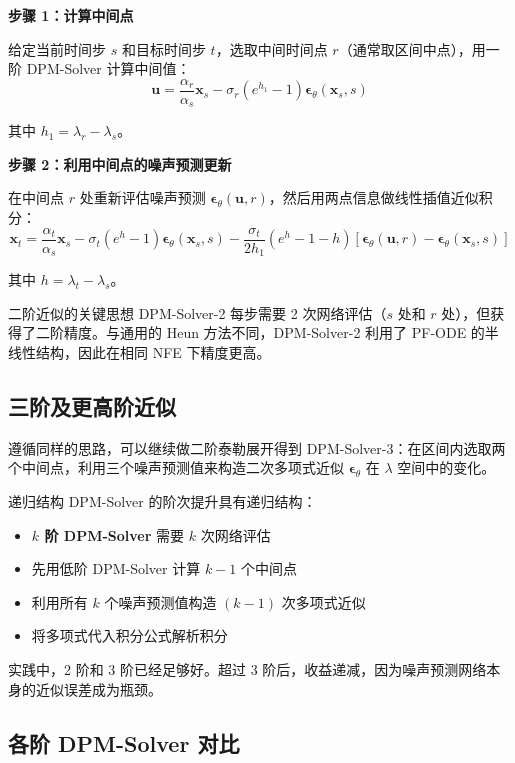 \documentclass[a4paper]{article}
\begin{document}
\textbf{步骤 1：计算中间点}

给定当前时间步 $s$ 和目标时间步 $t$，选取中间时间点 $r$（通常取区间中点），用一阶 DPM-Solver 计算中间值：
$$\mathbf{u} = \frac{\alpha_r}{\alpha_s} \mathbf{x}_s - \sigma_r (e^{h_1} - 1) \boldsymbol{\epsilon}_\theta(\mathbf{x}_s, s)$$

其中 $h_1 = \lambda_r - \lambda_s$。

\textbf{步骤 2：利用中间点的噪声预测更新}

在中间点 $r$ 处重新评估噪声预测 $\boldsymbol{\epsilon}_\theta(\mathbf{u}, r)$，然后用两点信息做线性插值近似积分：
$$\mathbf{x}_t = \frac{\alpha_t}{\alpha_s} \mathbf{x}_s - \sigma_t (e^{h} - 1) \boldsymbol{\epsilon}_\theta(\mathbf{x}_s, s) - \frac{\sigma_t}{2h_1}(e^{h} - 1 - h)\left[\boldsymbol{\epsilon}_\theta(\mathbf{u}, r) - \boldsymbol{\epsilon}_\theta(\mathbf{x}_s, s)\right]$$

其中 $h = \lambda_t - \lambda_s$。

\begin{importantbox}{二阶近似的关键思想}
DPM-Solver-2 每步需要 2 次网络评估（$s$ 处和 $r$ 处），但获得了二阶精度。与通用的 Heun 方法不同，DPM-Solver-2 利用了 PF-ODE 的半线性结构，因此在相同 NFE 下精度更高。
\end{importantbox}

\subsection{三阶及更高阶近似}

遵循同样的思路，可以继续做二阶泰勒展开得到 DPM-Solver-3：在区间内选取两个中间点，利用三个噪声预测值来构造二次多项式近似 $\boldsymbol{\epsilon}_\theta$ 在 $\lambda$ 空间中的变化。

\begin{knowledgebox}{递归结构}
DPM-Solver 的阶次提升具有递归结构：
\begin{itemize}
    \item \textbf{$k$ 阶 DPM-Solver} 需要 $k$ 次网络评估
    \item 先用低阶 DPM-Solver 计算 $k-1$ 个中间点
    \item 利用所有 $k$ 个噪声预测值构造 $(k-1)$ 次多项式近似
    \item 将多项式代入积分公式解析积分
\end{itemize}
实践中，2 阶和 3 阶已经足够好。超过 3 阶后，收益递减，因为噪声预测网络本身的近似误差成为瓶颈。
\end{knowledgebox}

\subsection{各阶 DPM-Solver 对比}
\end{document}
